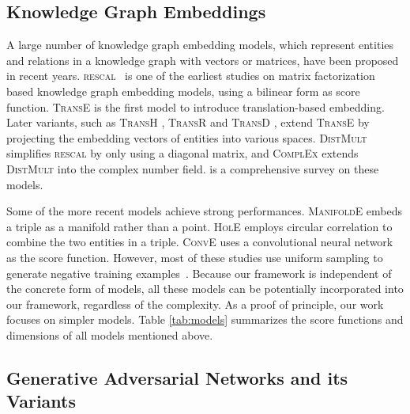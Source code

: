 \documentclass[11pt,a4paper]{article}
\begin{document}
\subsection{Knowledge Graph Embeddings}
A large number of knowledge graph embedding models, which represent entities and relations in a knowledge graph with 
vectors or matrices, have been proposed in recent years.  \textsc{rescal}~\cite{nickel2011three} is one of the earliest studies on matrix factorization based knowledge graph embedding models, using a bilinear form as score function.
\textsc{TransE} \cite{bordes2013translating} is the first model to introduce translation-based embedding. Later variants, such as \textsc{TransH} \cite{wang2014knowledge}, \textsc{TransR} \cite{lin2015learning} and \textsc{TransD} \cite{transd}, extend \textsc{TransE} by projecting the embedding vectors of entities into various spaces.
\textsc{DistMult}~\cite{yang2015embedding} simplifies \textsc{rescal} by only using a diagonal matrix, and \textsc{ComplEx} \cite{trouillon2016complex} extends \textsc{DistMult} into the complex number field. \cite{kgreview} is a comprehensive survey on these models.

Some of the more recent models achieve strong performances. \textsc{ManifoldE} \cite{manifolde} embeds a triple as a manifold rather than a point. \textsc{HolE} \cite{hole} employs circular correlation to combine the two entities in a triple. \textsc{ConvE} \cite{conve} uses a convolutional neural network as the score function. However, most of these studies use uniform sampling to generate negative training examples~\cite{bordes2013translating}. Because our framework is independent of the concrete form of models, all these models can be potentially incorporated into our framework, regardless of the complexity. As a proof of principle, our work focuses on simpler models. Table \ref{tab:models} summarizes the score functions and dimensions of all models mentioned above.


\subsection{Generative Adversarial Networks and its Variants}
\end{document}
